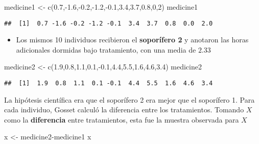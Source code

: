 \documentclass[
]{book}
\newenvironment{Shaded}{\begin{snugshade}}{\end{snugshade}}
\newcommand{\DecValTok}[1]{\textcolor[rgb]{0.00,0.00,0.81}{#1}}
\newcommand{\FloatTok}[1]{\textcolor[rgb]{0.00,0.00,0.81}{#1}}
\newcommand{\FunctionTok}[1]{\textcolor[rgb]{0.00,0.00,0.00}{#1}}
\newcommand{\NormalTok}[1]{#1}
\newcommand{\OtherTok}[1]{\textcolor[rgb]{0.56,0.35,0.01}{#1}}
\newcommand{\SpecialCharTok}[1]{\textcolor[rgb]{0.00,0.00,0.00}{#1}}
\providecommand{\tightlist}{%
  \setlength{\itemsep}{0pt}\setlength{\parskip}{0pt}}
\begin{document}
\begin{Shaded}
\begin{Highlighting}[]
\NormalTok{medicine1 }\OtherTok{\textless{}{-}} \FunctionTok{c}\NormalTok{(}\FloatTok{0.7}\NormalTok{,}\SpecialCharTok{{-}}\FloatTok{1.6}\NormalTok{,}\SpecialCharTok{{-}}\FloatTok{0.2}\NormalTok{,}\SpecialCharTok{{-}}\FloatTok{1.2}\NormalTok{,}\SpecialCharTok{{-}}\FloatTok{0.1}\NormalTok{,}\FloatTok{3.4}\NormalTok{,}\FloatTok{3.7}\NormalTok{,}\FloatTok{0.8}\NormalTok{,}\DecValTok{0}\NormalTok{,}\DecValTok{2}\NormalTok{)}
\NormalTok{medicine1}
\end{Highlighting}
\end{Shaded}

\begin{verbatim}
##  [1]  0.7 -1.6 -0.2 -1.2 -0.1  3.4  3.7  0.8  0.0  2.0
\end{verbatim}

\begin{itemize}
\tightlist
\item
  Los mismos 10 individuos recibieron el \textbf{soporífero 2} y anotaron las horas adicionales dormidas bajo tratamiento, con una media de \(2.33\)
\end{itemize}

\begin{Shaded}
\begin{Highlighting}[]
\NormalTok{medicine2 }\OtherTok{\textless{}{-}} \FunctionTok{c}\NormalTok{(}\FloatTok{1.9}\NormalTok{,}\FloatTok{0.8}\NormalTok{,}\FloatTok{1.1}\NormalTok{,}\FloatTok{0.1}\NormalTok{,}\SpecialCharTok{{-}}\FloatTok{0.1}\NormalTok{,}\FloatTok{4.4}\NormalTok{,}\FloatTok{5.5}\NormalTok{,}\FloatTok{1.6}\NormalTok{,}\FloatTok{4.6}\NormalTok{,}\FloatTok{3.4}\NormalTok{)}
\NormalTok{medicine2}
\end{Highlighting}
\end{Shaded}

\begin{verbatim}
##  [1]  1.9  0.8  1.1  0.1 -0.1  4.4  5.5  1.6  4.6  3.4
\end{verbatim}

La hipótesis científica era que el soporífero 2 era mejor que el soporífero 1. Para cada individuo, Gosset calculó la diferencia entre los tratamientos. Tomando \(X\) como la \textbf{diferencia} entre tratamientos, esta fue la muestra observada para \(X\)

\begin{Shaded}
\begin{Highlighting}[]
\NormalTok{x }\OtherTok{\textless{}{-}}\NormalTok{ medicine2}\SpecialCharTok{{-}}\NormalTok{medicine1}
\NormalTok{x}
\end{Highlighting}
\end{Shaded}
\end{document}
